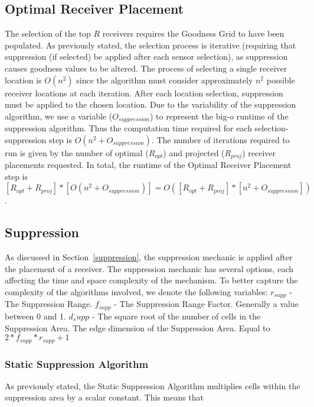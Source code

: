 \subsection{Optimal Receiver Placement}
The selection of the top $R$ receivers requires the Goodness Grid to have been populated.  As previously stated, the selection process is iterative (requiring that suppression (if selected) be applied after each sensor selection), as suppression causes goodness values to be altered.  The process of selecting a single receiver location is $O(n^2)$ since the algorithm must consider approximately $n^2$ possible receiver locations at each iteration.  After each location selection, suppression must be applied to the chosen location.  Due to the variability of the suppression algorithm, we use a variable  ($O_{suppression}$) to represent the big-o runtime of the suppression algorithm.  Thus the computation time required for each selection-suppression step is $O(n^2 + O_{suppression})$.  The number of iterations required to run is given by the number of optimal ($R_{opt}$) and projected ($R_{proj}$) receiver placements requested.  In total, the runtime of the Optimal Receiver Placement step is $[R_{opt} + R_{proj}] * [O(n^2 + O_{suppression})] = O([R_{opt} + R_{proj}]* [n^2 + O_{suppression}])$.


\subsection{Suppression}
As discussed in Section~\ref{suppression}, the suppression mechanic is applied after the placement of a receiver.  The suppression mechanic has several options, each affecting the time and space complexity of the mechanism.  To better capture the complexity of the algorithms involved, we denote the following variables:
$r_{supp}$ - The Suppression Range. 
$f_{supp}$ - The Suppression Range Factor.  Generally a value between 0 and 1.
$d_supp$ - The square root of the number of cells in the Suppression Area.  The edge dimension of the Suppression Area.  Equal to $2*f_{supp}*r_{supp} + 1$





\subsubsection{Static Suppression Algorithm}
As previously stated, the Static Suppression Algorithm multiplies cells within the suppression area by a scalar constant.  This means that 

